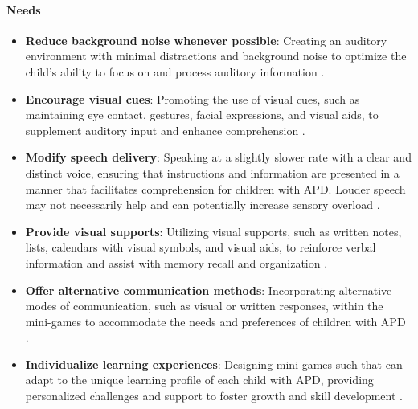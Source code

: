 \paragraph{Needs}
\begin{itemize}
    \item \textbf{Reduce background noise whenever possible}: Creating an auditory environment with minimal distractions and background noise to optimize the child's ability to focus on and process auditory information \cite{KidsHealth}.
    \item \textbf{Encourage visual cues}: Promoting the use of visual cues, such as maintaining eye contact, gestures, facial expressions, and visual aids, to supplement auditory input and enhance comprehension \cite{Nationwide}.
    \item \textbf{Modify speech delivery}: Speaking at a slightly slower rate with a clear and distinct voice, ensuring that instructions and information are presented in a manner that facilitates comprehension for children with APD. Louder speech may not necessarily help and can potentially increase sensory overload \cite{HearingHealth}.
    \item \textbf{Provide visual supports}: Utilizing visual supports, such as written notes, lists, calendars with visual symbols, and visual aids, to reinforce verbal information and assist with memory recall and organization \cite{KidsHealth}.
    \item \textbf{Offer alternative communication methods}: Incorporating alternative modes of communication, such as visual or written responses, within the mini-games to accommodate the needs and preferences of children with APD \cite{Nationwide}.
    \item \textbf{Individualize learning experiences}: Designing mini-games such that can adapt to the unique learning profile of each child with APD, providing personalized challenges and support to foster growth and skill development \cite{Nationwide}.
\end{itemize}

